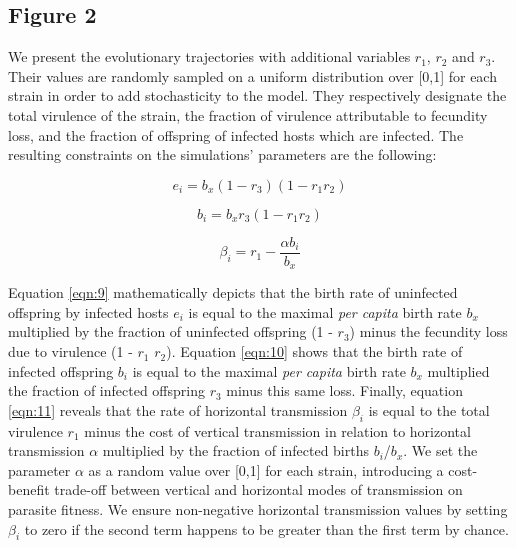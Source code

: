 \subsection{Figure 2}

We present the evolutionary trajectories with additional variables $r_1$, $r_2$ and $r_3$. Their values are randomly sampled on a uniform distribution over [0,1] for each strain in order to add stochasticity to the model. They respectively designate the total virulence of the strain, the fraction of virulence attributable to fecundity loss, and the fraction of offspring of infected hosts which are infected. The resulting constraints on the simulations’ parameters are the following: 

\begin{equation}
e_i = b_x(1 - r_3)(1- r_1 r_2)
\label{eqn:9}
\end{equation}

\begin{equation}
b_i = b_x r_3(1 - r_1 r_2)
\label{eqn:10}
\end{equation}

\begin{equation}
\beta_i = r_1 - \frac{\alpha b_i}{b_x}
\label{eqn:11}
\end{equation}

Equation \ref{eqn:9} mathematically depicts that the birth rate of uninfected offspring by infected hosts $e_i$ is equal to the maximal \emph{per capita} birth rate $b_x$ multiplied by the fraction of uninfected offspring (1 - $r_3$) minus the fecundity loss due to virulence (1 - $r_1$ $r_2$). Equation \ref{eqn:10} shows that the birth rate of infected offspring $b_i$ is equal to the maximal \emph{per capita} birth rate $b_x$ multiplied the fraction of infected offspring $r_3$ minus this same loss. Finally, equation \ref{eqn:11} reveals that the rate of horizontal transmission $\beta_i$ is equal to the total virulence $r_1$ minus the cost of vertical transmission in relation to horizontal transmission $\alpha$ multiplied by the fraction of infected births $b_i$/$b_x$. We set the parameter $\alpha$ as a random value over [0,1] for each strain, introducing a cost-benefit trade-off between vertical and horizontal modes of transmission on parasite fitness. We ensure non-negative horizontal transmission values by setting $\beta_i$ to zero if the second term happens to be greater than the first term by chance.

